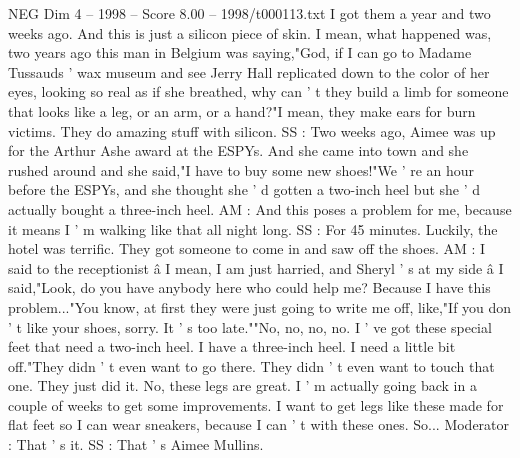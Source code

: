 \begin{textsample}{NEG Dim 4 – 1998 – Score 8.00 – 1998/t000113.txt}
I got them a year and two weeks ago.
And this is just a silicon piece of skin.
I mean, what happened was, two years ago this man in Belgium was saying,"God, if I can go to Madame Tussauds ' wax museum and see Jerry Hall replicated down to the color of her eyes, looking so real as if she breathed, why can ' t they build a limb for someone that looks like a leg, or an arm, or a hand?"I mean, they make ears for burn victims.
They do amazing stuff with silicon.
SS : Two weeks ago, Aimee was up for the Arthur Ashe award at the ESPYs.
And she came into town and she rushed around and she said,"I have to buy some new shoes!"We ' re an hour before the ESPYs, and she thought she ' d gotten a two-inch heel but she ' d actually bought a three-inch heel.
AM : And this poses a problem for me, because it means I ' m walking like that all night long.
SS : For 45 minutes.
Luckily, the hotel was terrific.
They got someone to come in and saw off the shoes.
AM : I said to the receptionist â I mean, I am just harried, and Sheryl ' s at my side â I said,"Look, do you have anybody here who could help me?
Because I have this problem..."You know, at first they were just going to write me off, like,"If you don ' t like your shoes, sorry.
It ' s too late.""No, no, no, no.
I ' ve got these special feet that need a two-inch heel.
I have a three-inch heel.
I need a little bit off."They didn ' t even want to go there.
They didn ' t even want to touch that one.
They just did it.
No, these legs are great.
I ' m actually going back in a couple of weeks to get some improvements.
I want to get legs like these made for flat feet so I can wear sneakers, because I can ' t with these ones.
So...
Moderator : That ' s it.
SS : That ' s Aimee Mullins.

\end{textsample}
